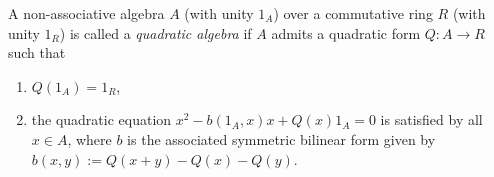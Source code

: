 \documentclass[12pt]{article}
\begin{document}
A non-associative algebra $A$ (with unity $1_A$) over a commutative
ring $R$ (with unity $1_R$) is called a \emph{quadratic algebra} if
$A$ admits a quadratic form $Q\colon A\to R$ such that
\begin{enumerate}
\item $Q(1_A)=1_R$,
\item the quadratic equation $x^2-b(1_A,x)x+Q(x)1_A=0$ is satisfied
by all $x\in A$, where $b$ is the associated symmetric bilinear form
given by $b(x,y):=Q(x+y)-Q(x)-Q(y)$.
\end{enumerate}
\end{document}
